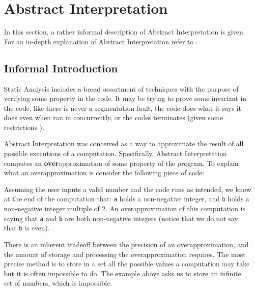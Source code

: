 \section{Abstract Interpretation}\label{abstract-interpretation}

In this section, a rather informal description of Abstract
Interpretation is given. For an in-depth explanation of Abstract
Interpretation refer to \autocites[Chapters 1 and
4]{nielson2015principles}{cousot_abstract_1977}{nipkow_abstract_2014}.

\subsection{Informal Introduction}\label{informal-introduction}

Static Analysis includes a broad assortment of techniques with the
purpose of verifying some property in the code. It may be trying to
prove some invariant in the code, like there is never a segmentation
fault, the code does what it says it does even when ran in concurrently,
or the codes terminates (given some restrictions
\autocite{urban_static_2015}).

Abstract Interpretation was conceived \autocite{cousot_abstract_1977} as
a way to approximate the result of all possible executions of a
computation. Specifically, Abstract Interpretation computes an
\textbf{over}approximation of some property of the program. To explain
what an overapproximation is consider the following piece of code:

\begin{Shaded}
\begin{Highlighting}[]
\OperatorTok{=} \NormalTok{(}\NormalTok{())}
\OperatorTok{=} 
\OperatorTok{=}  \OperatorTok{*}
\end{Highlighting}
\end{Shaded}

Assuming the user inputs a valid number and the code runs as intended,
we know at the end of the computation that: \texttt{a} holds a
non-negative integer, and \texttt{b} holds a non-negative integer
multiple of 2. An overapproximation of this computation is saying that
\texttt{a} and \texttt{b} are both non-negative integers (notice that we
do not say that \texttt{b} is even).

There is an inherent tradeoff between the precision of an
overapproximation, and the amount of storage and processing the
overapproximation requires. The most precise method is to store in a set
all the possible values a computation may take but it is often
impossible to do. The example above asks us to store an infinite set of
numbers, which is impossible.


